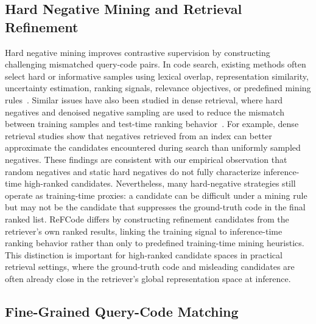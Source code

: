 \documentclass[10pt,conference]{IEEEtran}
\begin{document}
\subsection{Hard Negative Mining and Retrieval Refinement}

Hard negative mining improves contrastive supervision by constructing challenging mismatched query-code pairs. In code search, existing methods often select hard or informative samples using lexical overlap, representation similarity, uncertainty estimation, ranking signals, relevance objectives, or predefined mining rules~\cite{AAAIUA,CoCoHaNeRe,HedgeCode,R2PS}. Similar issues have also been studied in dense retrieval, where hard negatives and denoised negative sampling are used to reduce the mismatch between training samples and test-time ranking behavior~\cite{DPR,ANCE,HardNegDR,RocketQA}. For example, dense retrieval studies show that negatives retrieved from an index can better approximate the candidates encountered during search than uniformly sampled negatives. These findings are consistent with our empirical observation that random negatives and static hard negatives do not fully characterize inference-time high-ranked candidates. Nevertheless, many hard-negative strategies still operate as training-time proxies: a candidate can be difficult under a mining rule but may not be the candidate that suppresses the ground-truth code in the final ranked list. ReFCode differs by constructing refinement candidates from the retriever's own ranked results, linking the training signal to inference-time ranking behavior rather than only to predefined training-time mining heuristics. This distinction is important for high-ranked candidate spaces in practical retrieval settings, where the ground-truth code and misleading candidates are often already close in the retriever's global representation space at inference.

\subsection{Fine-Grained Query-Code Matching}
\end{document}
